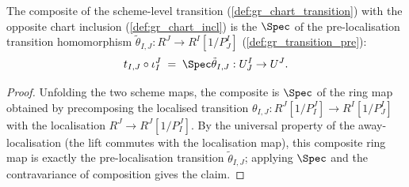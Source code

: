 \begin{lemma}\leanok
  \label{lem:gr_chartTransition_comp_chartIncl}
  The composite of the scheme-level transition
  (\cref{def:gr_chart_transition}) with the opposite chart inclusion
  (\cref{def:gr_chart_incl}) is the \(\Spec\) of the pre-localisation transition
  homomorphism \(\tilde\theta_{I,J} : R^J \to R^I[1/P^I_J]\)
  (\cref{def:gr_transition_pre}):
  \[
    t_{I,J} \circ \iota^J_I \;=\; \Spec \tilde\theta_{I,J} :
      U^I_J \to U^J .
  \]
\end{lemma}
\begin{proof}
  \leanok
  Unfolding the two scheme maps, the composite is \(\Spec\) of the ring map
  obtained by precomposing the localised transition \(\theta_{I,J} :
  R^J[1/P^J_I] \to R^I[1/P^I_J]\) with the localisation \(R^J \to R^J[1/P^J_I]\).
  By the universal property of the away-localisation (the lift commutes with the
  localisation map), this composite ring map is exactly the pre-localisation
  transition \(\tilde\theta_{I,J}\); applying \(\Spec\) and the contravariance of
  composition gives the claim.
\end{proof}

